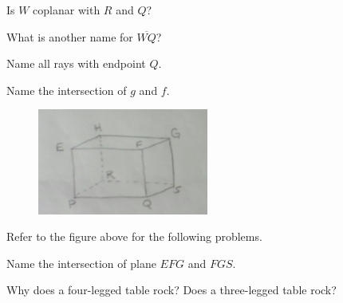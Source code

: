 \documentclass[12pt]{article}
\newenvironment{problem}[2][Problem]{\begin{trivlist}
\item[\hskip \labelsep {\bfseries #1}\hskip \labelsep {\bfseries #2.}]}{\end{trivlist}}
\begin{document}
\begin{problem}{5}
Is $W$ coplanar with $R$ and $Q$?
\end{problem}

\begin{problem}{6}
What is another name for $\overline{WQ}$?
\end{problem}

\begin{problem}{7}
Name all rays with endpoint $Q$.
\end{problem}

\begin{problem}{8}
Name the intersection of $g$ and $f$.
\end{problem}

\begin{figure}[H]
\centering
\includegraphics[width=0.5\textwidth]{two.jpg}
\end{figure}
Refer to the figure above for the following problems.

\begin{problem}{9}
Name the intersection of plane $EFG$ and $FGS$.
\end{problem}

\begin{problem}{10}
Why does a four-legged table rock? Does a three-legged table rock?
\end{problem}
\end{document}
